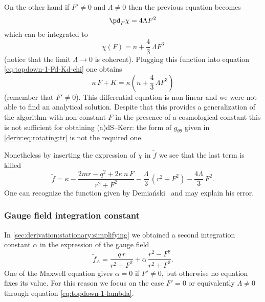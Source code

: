 On the other hand if $F' \neq 0$ and $\Lambda \neq 0$ then the previous equation becomes
\begin{equation}
	\pd_F \chi = 4 \Lambda F^2
\end{equation} 
which can be integrated to
\begin{equation}
	\label{top-down:eq:chi-F-solution}
	\chi(F) = n + \frac{4}{3}\, \Lambda F^3
\end{equation} 
(notice that the limit $\Lambda \to 0$ is coherent).
Plugging this function into equation \eqref{eq:topdown-1-Fd-Kd-chi} one obtains
\begin{equation}
	\label{eq:topdown-1-Fd-Kd-chi-replaced}
	\kappa\, F + K = \kappa \left(n + \frac{4}{3}\, \Lambda F^3 \right)
\end{equation} 
(remember that $F' \neq 0$).
This differential equation is non-linear and we were not able to find an analytical solution.
Despite that this provides a generalization of the algorithm with non-constant $F$ in the presence of a cosmological constant this is not sufficient for obtaining (a)dS--Kerr: the form of $g_{\theta\theta}$ given in \eqref{deriv:eq:rotating:tr} is not the required one.

Nonetheless by inserting the expression of $\chi$ in $\tilde f$ we see that the last term is killed
\begin{equation}
	\tilde f = \kappa - \frac{2m r - q^2 + 2 \kappa\, n\, F}{r^2 + F^2} - \frac{\Lambda}{3}\, (r^2 + F^2) - \frac{4 \Lambda}{3}\, F^2.
\end{equation} 
One can recognize the function given by Demiański~\cite{Demianski:1972:NewKerrlikeSpacetime} and may explain his error.


\subsubsection{Gauge field integration constant}
\label{sec:derivation:relaxing:gauge-fields}


In \cref{sec:derivation:stationary:simplifying} we obtained a second integration constant $\alpha$ in the expression of the gauge field
\begin{equation}
	\tilde f_A = \frac{q\, r}{r^2 + F^2} + \alpha\, \frac{r^2 - F^2}{r^2 + F^2}.
\end{equation}
One of the Maxwell equation gives $\alpha = 0$ if $F' \neq 0$, but otherwise no equation fixes its value.
For this reason we focus on the case $F' = 0$ or equivalently $\Lambda \neq 0$ through equation \eqref{eq:topdown-1-lambda}.

